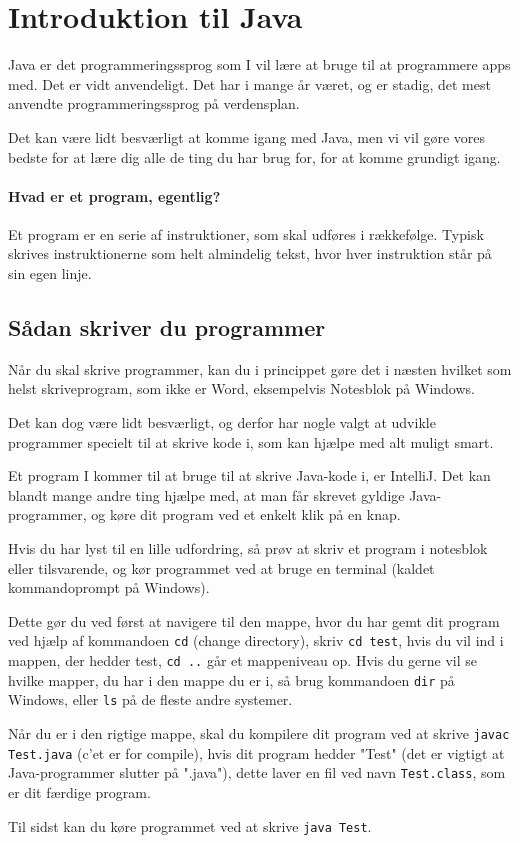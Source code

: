 \chapter{Introduktion til Java}
Java er det programmeringssprog som I vil lære at bruge til at programmere apps med. Det er vidt anvendeligt. Det har i mange år været, og er stadig, det mest anvendte programmeringssprog på verdensplan.

Det kan være lidt besværligt at komme igang med Java, men vi vil gøre vores bedste for at lære dig alle de ting du har brug for, for at komme grundigt igang.


\subsubsection{Hvad er et program, egentlig?}
Et program er en serie af instruktioner, som skal udføres i rækkefølge. Typisk skrives instruktionerne som helt almindelig tekst, hvor hver instruktion står på sin egen linje.

\section{Sådan skriver du programmer}
Når du skal skrive programmer, kan du i princippet gøre det i næsten hvilket som helst skriveprogram, som ikke er Word, eksempelvis Notesblok på Windows. 

Det kan dog være lidt besværligt, og derfor har nogle valgt at udvikle programmer specielt til at skrive kode i, som kan hjælpe med alt muligt smart. 

Et program I kommer til at bruge til at skrive Java-kode i, er IntelliJ. Det kan blandt mange andre ting hjælpe med, at man får skrevet gyldige Java-programmer, og køre dit program ved et enkelt klik på en knap.

\begin{remark}
	Hvis du har lyst til en lille udfordring, så prøv at skriv et program i notesblok eller tilsvarende, og kør programmet ved at bruge en terminal (kaldet kommandoprompt på Windows). 
	
	Dette gør du ved først at navigere til den mappe, hvor du har gemt dit program ved hjælp af kommandoen \texttt{cd} (change directory), skriv \texttt{cd test}, hvis du vil ind i mappen, der hedder test, \texttt{cd ..} går et mappeniveau op. Hvis du gerne vil se hvilke mapper, du har i den mappe du er i, så brug kommandoen \texttt{dir} på Windows, eller \texttt{ls} på de fleste andre systemer. 
	
	Når du er i den rigtige mappe, skal du kompilere dit program ved at skrive \texttt{javac Test.java} (c'et er for compile), hvis dit program hedder "Test" (det er vigtigt at Java-programmer slutter på ".java"), dette laver en fil ved navn \texttt{Test.class}, som er dit færdige program. 
	
	Til sidst kan du køre programmet ved at skrive \texttt{java Test}.
\end{remark}

